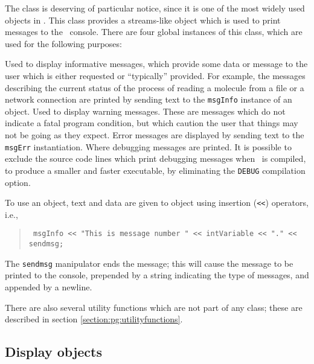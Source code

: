 The  class is deserving of particular notice, since it is one of the most widely used objects in \VMD.  This class provides a streams-like object which is used to print messages to the \VMD\ console.  There are four global instances of this class, which are used for the following purposes:
\begin{itemize}
Used to display informative messages, which provide some data or message to the user which is either requested or ``typically'' provided.  For example, the messages describing the current status of the process of reading a molecule from a file or a network connection are printed by sending text to the {\tt msgInfo} instance of an  object.
Used to display warning messages.  These are messages which do not indicate a fatal program condition, but which caution the user that things may not be going as they expect.
Error messages are displayed by sending text to the {\tt msgErr} instantiation. 
Where debugging messages are printed.  It is possible to exclude the source code lines which print debugging messages when \VMD\ is compiled, to produce a smaller and faster executable, by eliminating the {\tt DEBUG} compilation option.
\end{itemize}
To use an  object, text and data are given to object using insertion ({\tt <<}) operators, i.e.,
\begin{quote} {\tt
  msgInfo << "This is message number " << intVariable << "." << sendmsg;
} \end{quote}
The {\tt sendmsg} manipulator ends the message; this will cause the message to be printed to the console, prepended by a string indicating the type of messages, and appended by a newline.

There are also several utility functions which are not part of any class; these are described in section \ref{section:pg:utilityfunctions}.

\subsection{Display objects}

